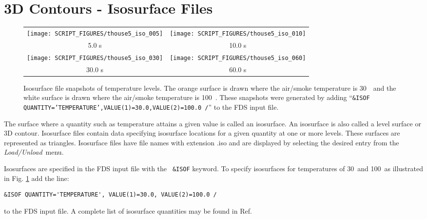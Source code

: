 \documentclass[11pt,twoside]{book}
\begin{document}
\section{3D Contours - Isosurface Files}
\label{section:isosurface}
\begin{figure}[\figoptions]
\begin{center}
\begin{tabular}{cc}
\texttt{[image: SCRIPT\_FIGURES/thouse5\_iso\_005]}&
\texttt{[image: SCRIPT\_FIGURES/thouse5\_iso\_010]}\\
5.0 s&10.0 s\\
\texttt{[image: SCRIPT\_FIGURES/thouse5\_iso\_030]}&
\texttt{[image: SCRIPT\_FIGURES/thouse5\_iso\_060]}\\
30.0 s&60.0 s
\end{tabular}
\end{center}
\caption [Isosurface file snapshots of temperature levels. ]

{ Isosurface file snapshots of temperature levels. The orange
surface is drawn where the air/smoke temperature is 30~\degC\ and
the white surface is drawn where the air/smoke temperature is
100~\degC. These snapshots were generated by adding ``{\tt\&ISOF
QUANTITY='TEMPERATURE',VALUE(1)=30.0,VALUE(2)=100.0 /}'' to the
FDS input file.}
\label{figiso}%
\end{figure}

The surface where a quantity such as temperature attains a given
value is called an isosurface. An isosurface is also called a
level surface or 3D contour. Isosurface files contain data
specifying isosurface locations for a given quantity at one or
more levels. These surfaces are represented as triangles.
Isosurface files have file names with extension .iso and are
displayed by selecting the desired entry from the {\em
Load/Unload}\ menu.

Isosurfaces are specified in the FDS input file with the {\tt
\&ISOF} keyword.  To specify isosurfaces for temperatures of
30\degC\ and 100\degC\ as illustrated in Fig. \ref{figiso} add
the line:
\begin{lstlisting}
&ISOF QUANTITY='TEMPERATURE', VALUE(1)=30.0, VALUE(2)=100.0 /
\end{lstlisting}
to the FDS input file.  A complete list of isosurface quantities
may be found in Ref.~\cite{FDS_Users_Guide}
\end{document}

